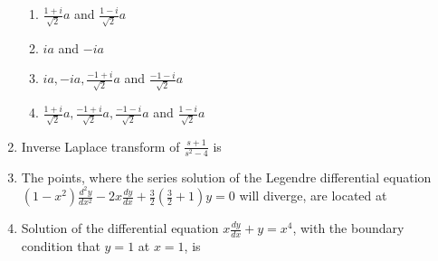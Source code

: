 \documentclass[journal,13pt,onecolumn]{IEEEtran}
\begin{document}
\begin{enumerate}[itemsep = 1em]
\hfill{}


\begin{enumerate}

\item $\frac{1+i}{\sqrt{2}}a$ and $\frac{1-i}{\sqrt{2}}a$
\item $ia$ and $-ia$
\item $ia, -ia, \frac{-1+i}{\sqrt{2}}a$ and $\frac{-1-i}{\sqrt{2}}a$
\item $\frac{1+i}{\sqrt{2}}a, \frac{-1+i}{\sqrt{2}}a, \frac{-1-i}{\sqrt{2}}a$ and $\frac{1-i}{\sqrt{2}}a$

\end{enumerate}

\vspace{2em}

\item Inverse Laplace transform of $\frac{s+1}{s^2-4}$ is

\hfill{}

\begin{enumerate}
\end{enumerate}

\item The points, where the series solution of the Legendre differential equation  
$(1-x^2)\frac{d^2y}{dx^2} - 2x\frac{dy}{dx} + \frac{3}{2}\left(\frac{3}{2}+1\right)y=0$  
will diverge, are located at

\hfill{}

\begin{enumerate}
\end{enumerate}

\vspace{3em}

\item Solution of the differential equation $x\frac{dy}{dx} + y = x^4$, with the boundary condition that $y=1$ at $x=1$, is


\end{enumerate}
\end{document}
